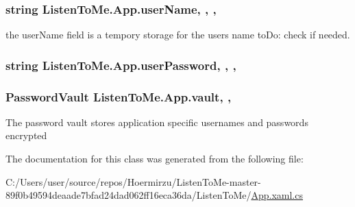 \subsubsection[{\texorpdfstring{user\+Name}{userName}}]{\setlength{\rightskip}{0pt plus 5cm}string Listen\+To\+Me.\+App.\+user\+Name\hspace{0.3cm}{\ttfamily [static]}, {\ttfamily [get]}, {}, {\ttfamily [package]}}\hypertarget{class_listen_to_me_1_1_app_a8cb2cb11cbb86861f2e1a11840270bf0}{}\label{class_listen_to_me_1_1_app_a8cb2cb11cbb86861f2e1a11840270bf0}


the user\+Name field is a tempory storage for the user\textquotesingle{}s name to\+Do\+: check if needed. 

\subsubsection[{\texorpdfstring{user\+Password}{userPassword}}]{\setlength{\rightskip}{0pt plus 5cm}string Listen\+To\+Me.\+App.\+user\+Password\hspace{0.3cm}{\ttfamily [static]}, {\ttfamily [get]}, {}, {\ttfamily [package]}}\hypertarget{class_listen_to_me_1_1_app_a64ce0f541633af939a3afca3a1d15dec}{}\label{class_listen_to_me_1_1_app_a64ce0f541633af939a3afca3a1d15dec}
\subsubsection[{\texorpdfstring{vault}{vault}}]{\setlength{\rightskip}{0pt plus 5cm}Password\+Vault Listen\+To\+Me.\+App.\+vault\hspace{0.3cm}{\ttfamily [static]}, {\ttfamily [get]}, {\ttfamily [set]}}\hypertarget{class_listen_to_me_1_1_app_ab90eb28339ec63046179e8756fd08314}{}\label{class_listen_to_me_1_1_app_ab90eb28339ec63046179e8756fd08314}


The password vault stores application specific usernames and passwords encrypted 



The documentation for this class was generated from the following file\+:\begin{DoxyCompactItemize}
\item 
C\+:/\+Users/user/source/repos/\+Hoermirzu/\+Listen\+To\+Me-\/master-\/89f0b49594deaade7bfad24dad062ff16eca36da/\+Listen\+To\+Me/\hyperlink{_app_8xaml_8cs}{App.\+xaml.\+cs}\end{DoxyCompactItemize}
